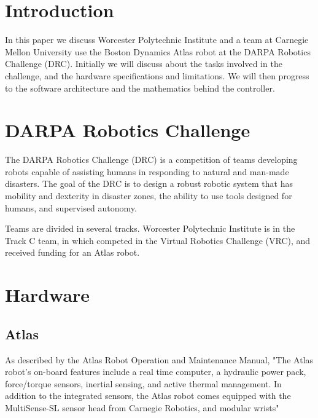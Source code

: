 \documentclass{article}
\begin{document}

\section{Introduction}

In this paper we discuss Worcester Polytechnic Institute and a team at Carnegie Mellon University use the Boston Dynamics Atlas robot at the DARPA Robotics Challenge (DRC). Initially we will discuss about the tasks involved in the challenge, and the hardware specifications and limitations. We will then progress to the software architecture and the mathematics behind the controller. 

\section{DARPA Robotics Challenge}
 
The DARPA Robotics Challenge (DRC) is a competition of teams developing robots capable of assisting humans in responding to natural and man-made disasters. The goal of the DRC is to design a robust robotic system that has mobility and dexterity in disaster zones, the ability to use tools designed for humans, and supervised autonomy.
 
Teams are divided in several tracks. Worcester Polytechnic Institute is in the Track C team, in which competed in the Virtual Robotics Challenge (VRC), and received funding for an Atlas robot.  

\section{Hardware}
\subsection{Atlas}

As described by the Atlas Robot Operation and Maintenance Manual, "The Atlas robot’s on-board features include a real time computer, a hydraulic power pack, force/torque sensors, inertial sensing, and active thermal management. In addition to the integrated sensors, the Atlas robot comes equipped with the MultiSense-SL sensor head from Carnegie Robotics, and modular wrists"		
\end{document}
